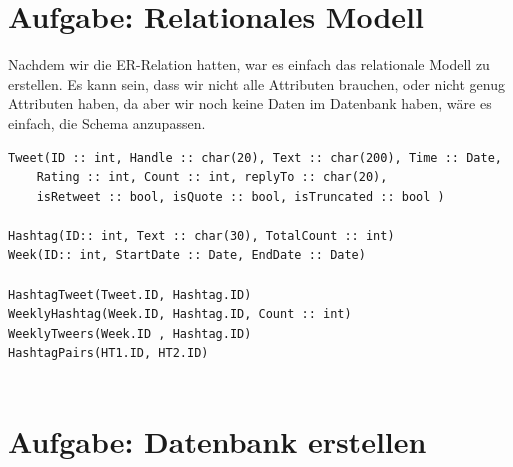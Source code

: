 \newpage

\section{Aufgabe: Relationales Modell}

Nachdem wir die ER-Relation hatten, war es einfach das relationale Modell zu erstellen. Es kann sein, dass wir nicht alle Attributen brauchen, oder nicht genug Attributen haben, da aber wir noch keine Daten im Datenbank haben, wäre es einfach, die Schema anzupassen.

\begin{verbatim}
Tweet(ID :: int, Handle :: char(20), Text :: char(200), Time :: Date, 
    Rating :: int, Count :: int, replyTo :: char(20), 
    isRetweet :: bool, isQuote :: bool, isTruncated :: bool )
    
Hashtag(ID:: int, Text :: char(30), TotalCount :: int)
Week(ID:: int, StartDate :: Date, EndDate :: Date)

HashtagTweet(Tweet.ID, Hashtag.ID)
WeeklyHashtag(Week.ID, Hashtag.ID, Count :: int)
WeeklyTweers(Week.ID , Hashtag.ID)
HashtagPairs(HT1.ID, HT2.ID)


\end{verbatim}

\section{Aufgabe: Datenbank erstellen}
	

